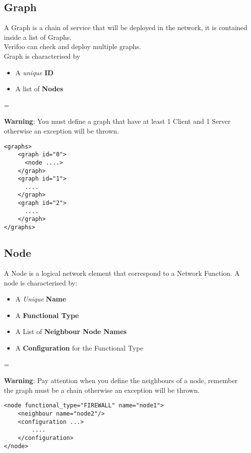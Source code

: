 \documentclass[a4paper,11pt]{article}
\newenvironment{warning}
  {\par\begin{mdframed}[backgroundcolor=mypink,linewidth=2pt,linecolor=red]%
    \begin{list}{}{\leftmargin=1cm
                   \labelwidth=\leftmargin}\item[\Large\ding{43}]}
  {\end{list}\end{mdframed}\par}
\begin{document}
\subsection*{Graph}
A Graph is a chain of service that will be deployed in the network, it is contained inside a list of Graphs. 
\\Verifoo can check and deploy multiple graphs.
\\Graph is characterised by 
\begin{itemize}
    \item A \textit{unique} \textbf{ID}
    \item A list of \textbf{Nodes}
\end{itemize}
\begin{warning}
\textbf{Warning}: You must define a graph that have at least 1 Client and 1 Server otherwise an exception will be thrown.
\end{warning}
\begin{lstlisting}[label={list:second},caption=Graphs Example]
<graphs>
    <graph id="0">
      <node ....>
    </graph>
    <graph id="1">
      ....
    </graph>
    <graph id="2">
      ....
    </graph>
</graphs>
\end{lstlisting}
\subsection*{Node}
A Node is a logical network element that correspond to a Network Function.
A node is characterised by:
\begin{itemize}
    \item A \textit{Unique} \textbf{Name}
    \item A \textbf{Functional Type}
    \item A List of \textbf{Neighbour Node Names}
    \item A \textbf{Configuration} for the Functional Type
\end{itemize}
\begin{warning}
\textbf{Warning}: Pay attention when you define the neighbours of a node, remember the graph must be a chain otherwise an exception will be thrown.
\end{warning}
\begin{lstlisting}[label={list:third},caption=Node Example]
<node functional_type="FIREWALL" name="node1">
    <neighbour name="node2"/>
    <configuration ...>
        ....
    </configuration>
</node>
\end{lstlisting}
\end{document}
